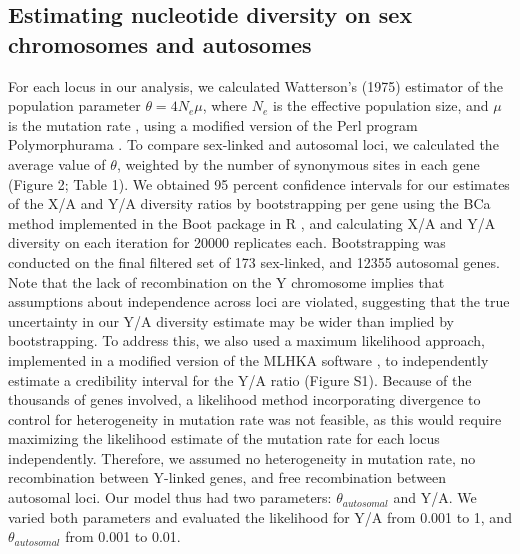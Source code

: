 \documentclass[9pt,twocolumn,twoside]{gsajnl}
\begin{document}
\subsection*{Estimating nucleotide diversity on sex chromosomes and autosomes}
For each locus in our analysis, we calculated Watterson’s (1975) estimator of the population parameter $\theta=4N_{e}\mu$, where $N_{e}$ is the effective population size, and $\mu$ is the mutation rate \citep{watterson1975}, using a modified version of the Perl program Polymorphurama \citep{bachtrog2006}. To compare sex-linked and autosomal loci, we calculated the average value of $\theta$, weighted by the number of synonymous sites in each gene (\X Figure 2; Table 1). We obtained 95 percent confidence intervals for our estimates of the X/A and Y/A diversity ratios by bootstrapping per gene using the BCa method \citep{efron1994} implemented in the Boot package in R \citep{canty2012boot}, and calculating X/A and Y/A diversity on each iteration for 20000 replicates each. Bootstrapping was conducted on the final filtered set of 173 sex-linked, and 12355 autosomal genes. Note that the lack of recombination on the Y chromosome implies that assumptions about independence across loci are violated, suggesting that the true uncertainty in our Y/A diversity estimate may be wider than implied by bootstrapping. To address this, we also used a maximum likelihood approach, implemented in a modified version of the MLHKA software \citep{wright2004hka}, to independently estimate a credibility interval for the Y/A ratio (Figure S1). Because of the thousands of genes involved, a likelihood method incorporating divergence to control for heterogeneity in mutation rate was not feasible, as this would require maximizing the likelihood estimate of the mutation rate for each locus independently. Therefore, we assumed no heterogeneity in mutation rate, no recombination between Y-linked genes, and free recombination between autosomal loci. Our model thus had two parameters: $\theta_{autosomal}$ and Y/A. We varied both parameters and evaluated the likelihood for Y/A from 0.001 to 1, and $\theta_{autosomal}$ from 0.001 to 0.01.

\end{document}
